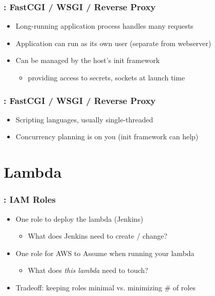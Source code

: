 \documentclass{beamer}
\begin{document}
\begin{frame}
	\frametitle{\insertsection : FastCGI / WSGI / Reverse Proxy}
	\begin{itemize}
		\pause \item Long-running application process handles many requests
		\pause \item Application can run as its own user (separate from webserver)
		\pause \item Can be managed by the host's init framework
			\begin{itemize}
				\item providing access to secrets, sockets at launch time
			\end{itemize}
	\end{itemize}
\end{frame}

\begin{frame}
	\frametitle{\insertsection : FastCGI / WSGI / Reverse Proxy}
	\begin{itemize}
		\pause \item Scripting languages, usually single-threaded
		\pause \item Concurrency planning is on you (init framework can help)
	\end{itemize}
\end{frame}

\section{Lambda}
\frame{\sectionpage}

\begin{frame}
	\frametitle{\insertsection : IAM Roles}
	\begin{itemize}
		\pause \item One role to deploy the lambda (Jenkins)
			\begin{itemize}
				\item What does Jenkins need to create / change?
			\end{itemize}
		\pause \item One role for \alert{AWS to Assume} when running your lambda
			\begin{itemize}
				\item What does \emph{this lambda} need to touch?
			\end{itemize}
		\pause \item Tradeoff: keeping roles minimal vs. minimizing \# of roles
	\end{itemize}
\end{frame}
\end{document}
